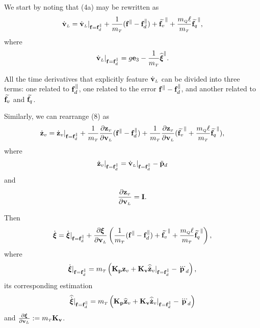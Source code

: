\documentclass[journal,onecolumn]{IEEEtran}
\begin{document}
	We start by noting that (4a) may be rewritten as
	\begin{equation}
		\vLdot = \vLdot|_{\f=\fd^{\|}} + \frac{1}{\mT}(\f^{\|}-\fd^{\|}) + \widetilde{\f_v}^{\|} + \frac{\mQ\ellp}{\mT}\widetilde{\f_q}^{\|},
		\label{eq:vL_dot_aux1}
	\end{equation}
	where
	\begin{equation}
		\vLdot|_{\f=\fd^{\|}} = g\ez - \frac{1}{\mT}\widehat{\Xiq}^{\|}.
	\end{equation}

	All the time derivatives that explicitly feature $\vLdot$ can be divided into three terms: one related to $\fd^{\|}$, one related to the error $\f^{\|}-\fd^{\|}$, and another related to $\widetilde{\f_v}$ and $\widetilde{\f_q}$.

	Similarly, we can rearrange (8) as
	\begin{equation}
		\zvdot = \zvdot|_{\f=\fd^{\|}} + \frac{1}{\mT}\frac{\partial\zv}{\partial\vL}(\f^{\|}-\fd^{\|}) + \frac{1}{\mT}\frac{\partial\zv}{\partial\vL}(\widetilde{\f_v}^{\|} + \frac{\mQ\ellp}{\mT}\widetilde{\f_q}^{\|}),
		\label{eq:zv_dot_aux1}
	\end{equation}
	where
	\begin{equation}
		\zvdot|_{\f=\fd^{\|}} = \vLdot|_{\f=\fd^{\|}} - \pLdddot
	\end{equation}
	and
	\begin{equation}
		\frac{\partial\zv}{\partial\vL} = \v{I}.
	\end{equation}

Then
%
\begin{align}
	\dot{\Xiq} = \dot{\Xiq}|_{\f=\fd^{\|}} + \frac{\partial \Xiq}{\partial \vL}\LP\frac{1}{\mT}(\f^{\|}-\fd^{\|}) + \widetilde{\f_v}^{\|} + \frac{\mQ\ellp}{\mT}\widetilde{\f_q}^{\|}\RP,
\end{align}
%
where
%
\begin{align}
	\dot{\Xiq}|_{\f=\fd^{\|}} = \mT\LP {\bf K_p}\zv + {\bf K_v} \zvdothat|_{\f=\fd^{\|}}
	- \pLdtdot\RP,
\end{align}
%
its corresponding estimation
%
\begin{align}
	\widehat{\dot{\Xiq}}|_{\f=\fd^{\|}} = \mT\LP {\bf K_p}\zvhat + {\bf K_v} \zvdothat|_{\f=\fd^{\|}}
	- \pLdtdot\RP
\end{align}
%
and $\frac{\partial \Xiq}{\partial \vL}:=\mT{\bf K_v}$.
\end{document}
